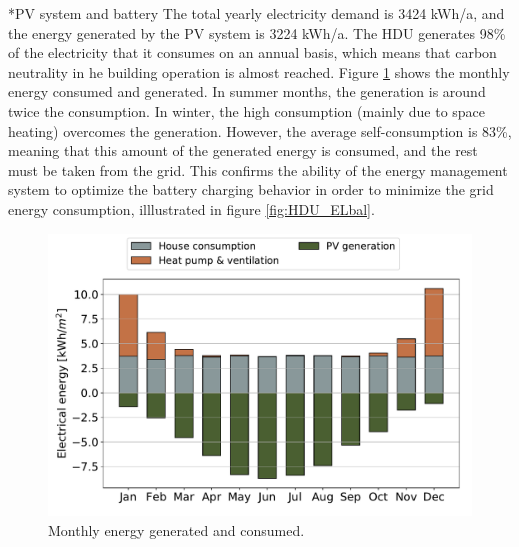 \documentclass[twocolumn, a4paper,10pt]{article}
\makeatletter
\renewcommand\subsection{\@startsection{subsection}{1}{\z@}{\z@}{\z@}{\normalfont\normalsize\bfseries}}
\renewcommand\subsection{\@startsection{subsection}{1}{\z@}{\z@}{0.1pt}{\normalfont\normalsize\bfseries}}
\makeatother
\begin{document}
\subsection*{PV system and battery}
The total yearly electricity demand is 3424 kWh/a, and the energy generated by the PV system is 3224 kWh/a. The HDU generates 98\% of the electricity that it consumes on an annual basis, which means that carbon neutrality in he building operation is almost reached. Figure \ref{fig:HDU_PVbal} shows the monthly energy consumed and generated. In summer months, the generation is around twice the consumption. In winter, the high consumption (mainly due to space heating) overcomes the generation. However, the average self-consumption is 83\%, meaning that this amount of the generated energy is consumed, and the rest must be taken from the grid. This confirms the ability of the energy management system to optimize the battery charging behavior in order to minimize the grid energy consumption, illlustrated in figure \ref{fig:HDU_ELbal}. 

\begin{figure}[H]
\vspace{-2pt} 
\centering
\includegraphics[scale=0.34]{img/HDU_PVbal.pdf}
\caption{Monthly energy generated and consumed.}
\label{fig:HDU_PVbal}
\end{figure}
\end{document}
